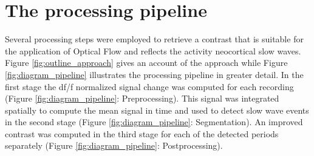 \section{The processing pipeline}
\label{processing_pipeline}
Several processing steps were employed to retrieve a contrast that is suitable for the application of Optical Flow and reflects the activity neocortical slow waves. Figure \ref{fig:outline_approach} gives an account of the approach while Figure \ref{fig:diagram_pipeline} illustrates the processing pipeline in greater detail. In the first stage the df/f normalized signal change was computed for each recording (Figure \ref{fig:diagram_pipeline}: Preprocessing). This signal was integrated spatially to compute the mean signal in time and used to detect slow wave events in the second stage (Figure \ref{fig:diagram_pipeline}: Segmentation). An improved contrast was computed in the third stage for each of the detected periods separately (Figure \ref{fig:diagram_pipeline}: Postprocessing).\\
